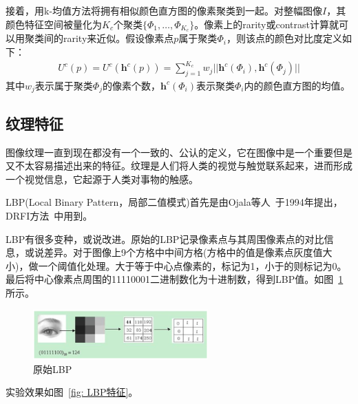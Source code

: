 \documentclass[12pt]{article}
\begin{document}
接着，用k-均值方法将拥有相似颜色直方图的像素聚类到一起。对整幅图像$I$，其颜色特征空间被量化为$K_c$个聚类$\{\Phi_1,\ldots,\Phi_{K_c}\}$。像素上的rarity或contrast计算就可以用聚类间的rarity来近似。假设像素点$p$属于聚类$\Phi_i$，则该点的颜色对比度定义如下：
\begin{align}
U^c(p) = U^c(\mathbf{h}^c(p)) = \sum_{j=1}^{K_c }w_j||\mathbf{h}^c(\Phi_i), \mathbf{h}^c(\Phi_j)||
\end{align}
其中$w_j$表示属于聚类$\Phi_j$的像素个数，$\mathbf{h}^c(\Phi_i)$表示聚类$\Phi_i$内的颜色直方图的均值。

\subsection{纹理特征}

图像纹理一直到现在都没有一个一致的、公认的定义，它在图像中是一个重要但是又不太容易描述出来的特征。纹理是人们将人类的视觉与触觉联系起来，进而形成一个视觉信息，它起源于人类对事物的触感。

LBP(Local Binary Pattern，局部二值模式)首先是由Ojala等人~\cite{ojala1994performance}于1994年提出，DRFI方法~\cite{jianghuaizu2013salient}中用到。

LBP有很多变种，或说改进。原始的LBP记录像素点与其周围像素点的对比信息，或说差异。对于图像上9个方格中中间方格(方格中的值是像素点灰度值大小)，做一个阈值化处理。大于等于中心点像素的，标记为1，小于的则标记为0。最后将中心像素点周围的11110001二进制数化为十进制数，得到LBP值。如图~\ref{fig: LBP}所示。

\begin{figure}[!ht]
\centering
\includegraphics[width=0.6\textwidth]{LBP.png}
\caption{原始LBP}
\label{fig: LBP}
\end{figure} 

实验效果如图~\ref{fig: LBP特征}。
\end{document}
